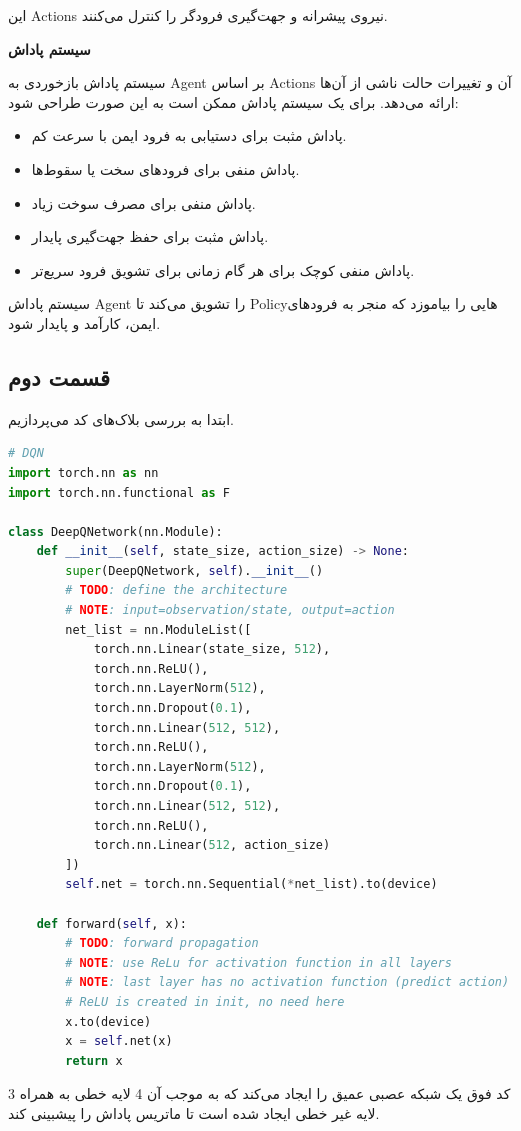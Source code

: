 \documentclass{article}
\begin{document}
 این Actions نیروی پیشرانه و جهت‌گیری فرودگر را کنترل می‌کنند.
 
 \textbf{سیستم پاداش}
 
 سیستم پاداش بازخوردی به Agent بر اساس Actions آن و تغییرات حالت ناشی از آن‌ها ارائه می‌دهد. برای یک  سیستم پاداش ممکن است به این صورت طراحی شود:
 \begin{itemize}

 \item پاداش مثبت برای دستیابی به فرود ایمن با سرعت کم.
 \item پاداش منفی برای فرودهای سخت یا سقوط‌ها.
 \item پاداش منفی برای مصرف سوخت زیاد.
 \item پاداش مثبت برای حفظ جهت‌گیری پایدار.
 \item پاداش منفی کوچک برای هر گام زمانی برای تشویق فرود سریع‌تر.
   \end{itemize}
 سیستم پاداش Agent را تشویق می‌کند تا Policy‌هایی را بیاموزد که منجر به فرودهای ایمن، کارآمد و پایدار شود.
 \cite{xu_2024}

\subsection{قسمت دوم}

ابتدا به بررسی بلاک‌های کد می‌پردازیم.
\begin{LTR}
	\begin{lstlisting}[language=Python, caption=Deep Neural Network]
# DQN
import torch.nn as nn
import torch.nn.functional as F

class DeepQNetwork(nn.Module):
    def __init__(self, state_size, action_size) -> None:
        super(DeepQNetwork, self).__init__()
        # TODO: define the architecture
        # NOTE: input=observation/state, output=action
        net_list = nn.ModuleList([
            torch.nn.Linear(state_size, 512),
            torch.nn.ReLU(),
            torch.nn.LayerNorm(512),
            torch.nn.Dropout(0.1),
            torch.nn.Linear(512, 512),
            torch.nn.ReLU(),
            torch.nn.LayerNorm(512),
            torch.nn.Dropout(0.1),
            torch.nn.Linear(512, 512),
            torch.nn.ReLU(),
            torch.nn.Linear(512, action_size)
        ])
        self.net = torch.nn.Sequential(*net_list).to(device)

    def forward(self, x):
        # TODO: forward propagation
        # NOTE: use ReLu for activation function in all layers
        # NOTE: last layer has no activation function (predict action)
        # ReLU is created in init, no need here
        x.to(device)
        x = self.net(x)
        return x
	\end{lstlisting}
\end{LTR}
کد فوق یک شبکه عصبی عمیق را ایجاد می‌کند که به موجب آن 4 لایه خطی به همراه 3 لایه غیر خطی ایجاد شده است تا ماتریس پاداش را پیشبینی کند.
\end{document}
